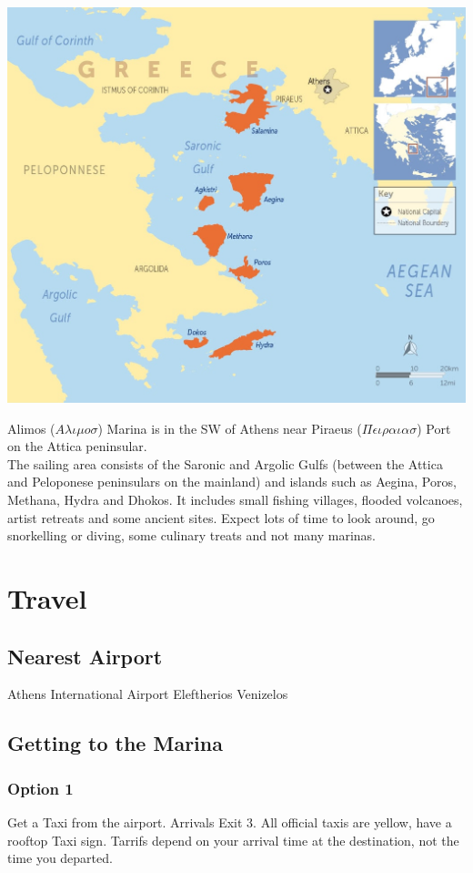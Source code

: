 


\noindent \includegraphics[scale=0.25]{saronic-map.jpg} 

\noindent Alimos ($ A\lambda\iota\mu o \sigma $) Marina is in the SW of Athens near Piraeus ($ \Pi\epsilon\iota\rho\alpha\iota\alpha\sigma $) Port on the Attica peninsular.\\
The sailing area consists of the Saronic and Argolic Gulfs (between the Attica and Peloponese peninsulars on the mainland) and islands such as Aegina, Poros, Methana, Hydra and Dhokos.  It includes small fishing villages, flooded volcanoes, artist retreats and some ancient sites.  Expect lots of time to look around, go snorkelling or diving, some culinary treats and not many marinas.


\section*{Travel}
\subsection*{Nearest Airport}
Athens International Airport Eleftherios Venizelos

\subsection*{Getting to the Marina}
\subsubsection*{Option 1}
Get a Taxi from the airport.  Arrivals Exit 3.  All official taxis are yellow, have a rooftop Taxi sign.  Tarrifs depend on your arrival time at the destination, not the time you departed.
